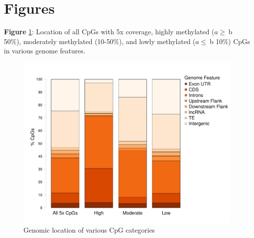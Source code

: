 \documentclass [11pt, proquest] {uwthesis}[2015/03/03]
\begin{document}
\begin{landscape}
\end{landscape}
\clearpage

\hypertarget{figures-2}{%
\section{Figures}\label{figures-2}}

\textbf{Figure} \ref{fig:fembackground}: Location of all CpGs with 5x coverage, highly methylated (\(a \geq \ \)b 50\%), moderately methylated (10-50\%), and lowly methylated (\(a \leq \ \)b 10\%) CpGs in various genome features.\newline 
\begin{figure}[h]
\centering
  \includegraphics[width=1\textwidth]{figure/Ch3/Figure3.1.pdf}
  \caption{Genomic location of various CpG categories}
  \label{fig:fembackground}
\end{figure}
\clearpage
\end{document}
